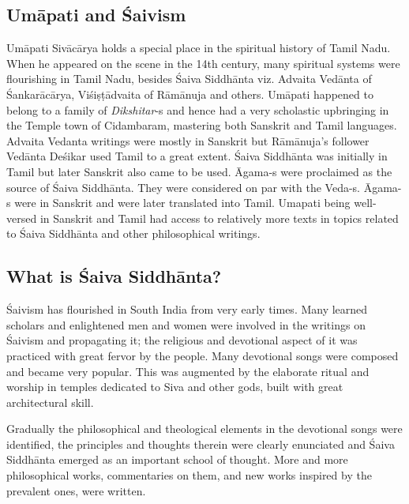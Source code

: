 \subsection*{Umāpati and Śaivism}

\vskip -4pt

Umāpati Sivācārya holds a special place in the spiritual history of Tamil Nadu. When he appeared on the scene in the 14th century, many spiritual systems were flourishing in Tamil Nadu, besides Śaiva Siddhānta viz. Advaita Vedānta of Śankarācārya, Viśiṣṭādvaita of Rāmānuja and others. Umāpati happened to belong to a family of \textit{Dikshitar}-s and hence had a very scholastic upbringing in the Temple town of Cidambaram, mastering both Sanskrit and Tamil languages. Advaita Vedanta writings were mostly in Sanskrit but Rāmānuja’s follower Vedānta Deśikar used Tamil to a great extent. Śaiva Siddhānta was initially in Tamil but later Sanskrit also came to be used. Āgama-s were proclaimed as the source of Śaiva Siddhānta. They were considered on par with the Veda-s. Āgama-s were in Sanskrit and were later translated into Tamil. Umapati being well-versed in Sanskrit and Tamil had access to relatively more texts in topics related to Śaiva Siddhānta and other philosophical writings.


\subsection*{What is Śaiva Siddhānta?}

\vskip -4pt

Śaivism has flourished in South India from very early times. Many learned scholars and enlightened men and women were involved in the writings on Śaivism and propagating it; the religious and devotional aspect of it was practiced with great fervor by the people. Many devotional songs were composed and became very popular. This was augmented by the elaborate ritual and worship in temples dedicated to Siva and other gods, built with great architectural skill.

Gradually the philosophical and theological elements in the devotional songs were identified, the principles and thoughts therein were clearly enunciated and Śaiva Siddhānta emerged as an important school of thought. More and more philosophical works, commentaries on them, and new works inspired by the prevalent ones, were written.


